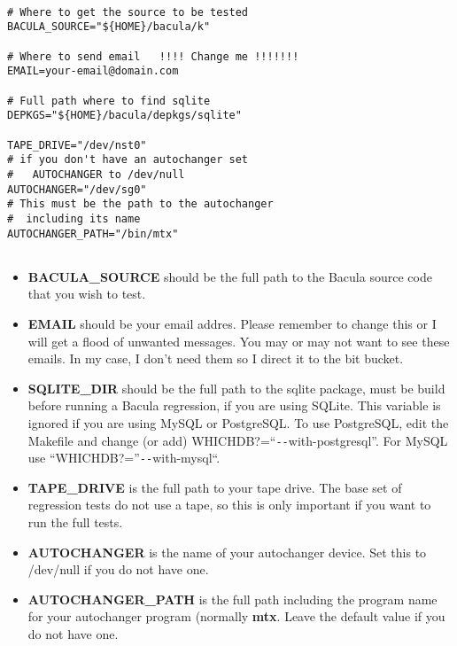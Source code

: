 \footnotesize
\begin{verbatim}
                                                                                        
# Where to get the source to be tested
BACULA_SOURCE="${HOME}/bacula/k"
                                                                                        
# Where to send email   !!!! Change me !!!!!!!
EMAIL=your-email@domain.com
                                                                                        
# Full path where to find sqlite
DEPKGS="${HOME}/bacula/depkgs/sqlite"
                                                                                        
TAPE_DRIVE="/dev/nst0"
# if you don't have an autochanger set
#   AUTOCHANGER to /dev/null
AUTOCHANGER="/dev/sg0"
# This must be the path to the autochanger
#  including its name
AUTOCHANGER_PATH="/bin/mtx"
                                                                                        
\end{verbatim}
\normalsize

\begin{itemize}
\item {\bf BACULA\_SOURCE} should be the full path to the Bacula source code 
   that you wish to test. 
\item {\bf EMAIL} should be your email addres. Please remember  to change this
   or I will get a flood of unwanted  messages. You may or may not want to see
   these emails. In  my case, I don't need them so I direct it to the bit bucket.

\item {\bf SQLITE\_DIR} should be the full path to the sqlite package,  must
   be build before running a Bacula regression, if you are  using SQLite. This
   variable is ignored if you are using  MySQL or PostgreSQL. To use PostgreSQL,
edit the Makefile  and change (or add) WHICHDB?=``\verb{--{with-postgresql''.  For
MySQL use ``WHICHDB?=''\verb{--{with-mysql``. 
\item {\bf TAPE\_DRIVE} is the full path to your tape drive.  The base set of
   regression tests do not use a tape, so  this is only important if you want to
   run the full tests. 
\item {\bf AUTOCHANGER} is the name of your autochanger device.  Set this to
   /dev/null if you do not have one. 
\item {\bf AUTOCHANGER\_PATH} is the full path including the  program name for
   your autochanger program (normally  {\bf mtx}. Leave the default value if you
   do not have one. 
\end{itemize}

